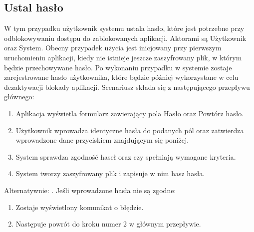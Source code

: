 \subsection{Ustal hasło}
W tym przypadku użytkownik systemu ustala hasło, które jest potrzebne przy odblokowywaniu dostępu do zablokowanych aplikacji. Aktorami są Użytkownik oraz System. Obecny przypadek użycia jest inicjowany przy pierwszym uruchomieniu aplikacji, kiedy nie istnieje jeszcze zaszyfrowany plik, w którym będzie przechowywane hasło. Po wykonaniu przypadku w systemie zostaje zarejestrowane hasło użytkownika, które będzie później wykorzystane w celu dezaktywacji blokady aplikacji. Scenariusz składa się z następującego przepływu głównego:
\begin{enumerate}
    \item Aplikacja wyświetla formularz zawierający pola Hasło oraz Powtórz hasło.
    \item Użytkownik wprowadza identyczne hasła do podanych pól oraz zatwierdza wprowadzone dane przyciskiem znajdującym się poniżej.
    \item System sprawdza zgodność haseł oraz czy spełniają wymagane kryteria.
    \item System tworzy zaszyfrowany plik i zapisuje w nim hasz hasła.
\end{enumerate}
Alternatywnie:
\newline\newline
{}. Jeśli wprowadzone hasła nie są zgodne:
\begin{enumerate}[leftmargin=3\parindent]
    \item Zostaje wyświetlony komunikat o błędzie.
    \item Następuje powrót do kroku numer 2 w głównym przepływie.
\end{enumerate}


